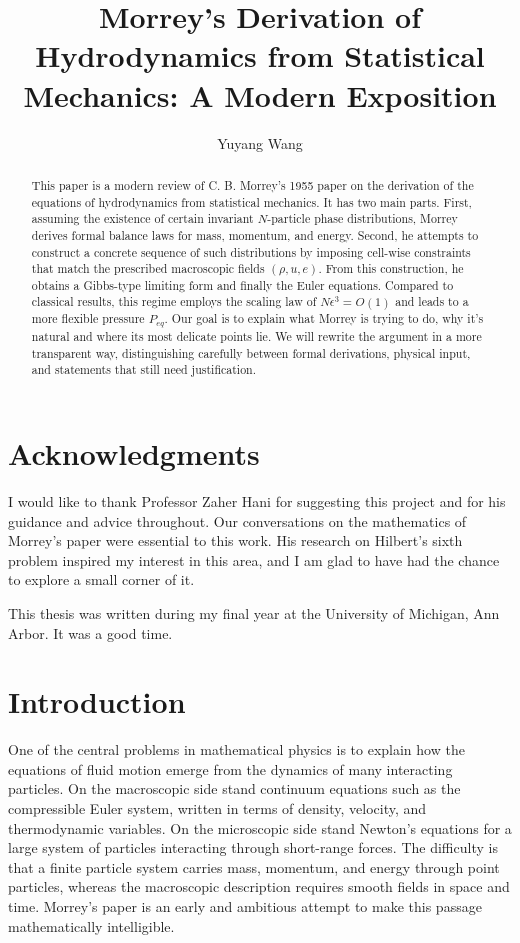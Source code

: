 \documentclass[11pt]{article}
\title{\textbf{Morrey’s Derivation of Hydrodynamics from Statistical Mechanics: A Modern Exposition}}
\author{Yuyang Wang}
\begin{document}
\maketitle
\begin{abstract}
This paper is a modern review of C. B. Morrey's 1955 paper on the derivation of the equations of hydrodynamics from statistical mechanics. It has two main parts. First, assuming the existence of certain invariant $N$-particle phase distributions, Morrey derives formal balance laws for mass, momentum, and energy. Second, he attempts to construct a concrete sequence of such distributions by imposing cell-wise constraints that match the prescribed macroscopic fields $(\rho,u,e)$. From this construction, he obtains a Gibbs-type limiting form and finally the Euler equations. Compared to classical results, this regime employs the scaling law of $N\epsilon^3=O(1)$ and leads to a more flexible pressure $P_{eq}$. Our goal is to explain what Morrey is trying to do, why it's natural and where its most delicate points lie. We will rewrite the argument in a more transparent way, distinguishing carefully between formal derivations, physical input, and statements that still need justification.
\end{abstract}

\tableofcontents

\section*{Acknowledgments}
I would like to thank Professor Zaher Hani for suggesting
this project and for his guidance and advice throughout.
Our conversations on the mathematics of Morrey's paper were
essential to this work.
His research on Hilbert's sixth problem inspired my
interest in this area, and I am glad to have had the
chance to explore a small corner of it.

This thesis was written during my final year at the
University of Michigan, Ann Arbor. It was a good time.

\section{Introduction}\label{sec:setup}

One of the central problems in mathematical physics is to explain how the equations of fluid motion emerge from the dynamics of many interacting particles. On the macroscopic side stand continuum equations such as the compressible Euler system, written in terms of density, velocity, and thermodynamic variables. On the microscopic side stand Newton's equations for a large system of particles interacting through short-range forces. The difficulty is that a finite particle system carries mass, momentum, and energy through point particles, whereas the macroscopic description requires smooth fields in space and time. Morrey's paper \cite{Morrey1955} is an early and ambitious attempt to make this passage mathematically intelligible.
\end{document}
